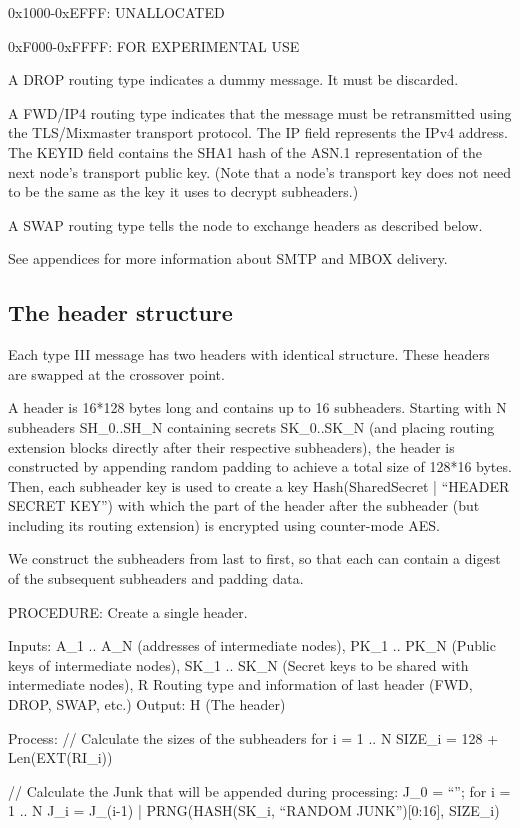 0x1000-0xEFFF: UNALLOCATED

0xF000-0xFFFF: FOR EXPERIMENTAL USE

A DROP routing type indicates a dummy message. It must be discarded.

A FWD/IP4 routing type indicates that the message must be
retransmitted using the TLS/Mixmaster transport protocol. The IP field
represents the IPv4 address.  The KEYID field contains the SHA1 hash
of the ASN.1 representation of the next node's transport public key.
(Note that a node's transport key does not need to be the same as the
key it uses to decrypt subheaders.)

A SWAP routing type tells the node to exchange headers as described below.

See appendices for more information about SMTP and MBOX delivery.

\subsection{The header structure}

Each type III message has two headers with identical structure. These
headers are swapped at the crossover point.

A header is 16*128 bytes long and contains up to 16
subheaders. Starting with N subheaders SH_0..SH_N containing secrets
SK_0..SK_N (and placing routing extension blocks directly after their
respective subheaders), the header is constructed by appending 
random padding to achieve a total size
of 128*16 bytes. Then, each subheader key is used to create a key
Hash(SharedSecret | ``HEADER SECRET KEY'') with which the part of the
header after the subheader (but including its routing extension) is
encrypted using counter-mode AES.

We construct the subheaders from last to first, so that each can contain
a digest of the subsequent subheaders and padding data.

PROCEDURE: Create a single header.

Inputs: A_1 .. A_N (addresses of intermediate nodes), 
	PK_1 .. PK_N (Public keys of intermediate nodes),
	SK_1 .. SK_N (Secret keys to be shared with intermediate nodes),
        R Routing type and information of last header (FWD, DROP, SWAP, etc.)
Output: H (The header)

Process: 
  // Calculate the sizes of the subheaders
  for i = 1 .. N
	SIZE_i = 128 + Len(EXT(RI_i))

  // Calculate the Junk that will be appended during processing:
  J_0 = ``'';
  for i = 1 .. N
	J_i = J_(i-1) | PRNG(HASH(SK_i, ``RANDOM JUNK'')[0:16], SIZE_i)

